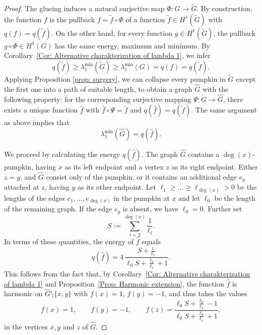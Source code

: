 \documentclass[reqno]{amsart}
\theoremstyle{plain}
\theoremstyle{definition}
\theoremstyle{remark}
\numberwithin{equation}{section}
\begin{document}
\begin{proof}
	The glueing induces a natural surjective map $\Phi\colon G \to \widetilde{G}$. By construction, the function $f$ is the pullback $f = \widetilde{ f} \circ \Phi $ of a function $\widetilde f \in H^1(\widetilde G)$ with $q(f) = q(\widetilde{ f})$. On the other hand, for every function $g \in H^1(\widetilde{G})$, the pullback $g \circ \Phi \in H^1(G)$ has the same energy, maximum and minimum. By Corollary~\ref{Cor: Alternative charakterization of lambda 1}, we infer
	\[
	q(\widetilde{ f})	\geq \lambda_{1}^{\min}(\widetilde{G}) \geq \lambda_{1}^{\min}(G) = q(f) = q(\widetilde{ f}).
	\]
	Applying Proposition \ref{prop: surgery}, we can collapse every pumpkin in $\widetilde G$ except the first one into a path of suitable length, to obtain a graph $\widehat{G}$ with the following property: for the corresponding surjective mapping $\Psi\colon \widetilde{G} \to \widehat{G}$, there exists a unique function $\widehat{f}$ with $\widehat{f} \circ \Psi = \widetilde{ f}$ and $q(\widehat{f}) = q(\widetilde{ f})$. The same argument as above implies that
	\[
	\lambda_{1}^{\min}(\widehat{G}) = q(\widehat{f}). 
	\]
	
	We proceed by calculating the energy $q(\widehat{f})$. The graph $\widehat{G}$ contains a $\deg(x)$-pumpkin, having $x$ as its left endpoint and a vertex $z$ as its right endpoint. Either $z=y$, and $\widehat G$ consist only of the pumpkin, or it contains an additional edge $e_y$ attached at $z$, having $y$ as its other endpoint. Let $\ell_1\geq \dots\geq \ell_{\deg (x)} >0$ be the lengths of the edges $e_1, \dots, e_{\deg(x)}$ in the pumpkin at $x$ and let $\ell_0$ be the length of the remaining graph. If the edge $e_y$ is absent, we have $\ell_0 = 0$. Further set
	\[
	S := \sum_{i=2}^{\deg(x)} \frac{1}{\ell_i}.
	\]
	In terms of these quantities, the energy of $\widehat f$ equals
	\[
	q(\widehat{f}) =  4 \, \frac{S + \frac{1}{\ell_1}}{\ell_0S + \frac{\ell_0}{\ell_1} +1}.
	\] 
	This follows from the fact that, by Corollary~\ref{Cor: Alternative charakterization of lambda 1} and Proposition~\ref{Prop: Harmonic extension}, the function $\widehat f$ is harmonic on $\widehat G\setminus \{x,y\}$ with $f(x) = 1$, $f(y) =-1$, and thus takes the values
	\[
	f(x) = 1, \qquad f(y) = - 1, \qquad  f(z) = \frac{\ell_0 S+ \frac{\ell_0}{\ell_1} - 1}{\ell_0 S + \frac{\ell_0}{\ell_1} +1},
	\]
	in the vertices $x,y$ and $z$ of $\widehat G$. 
	

\end{proof}
\end{document}
